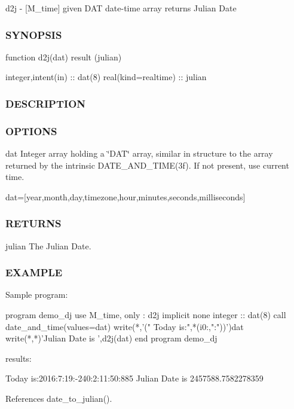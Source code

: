 d2j -\/ \mbox{[}M\+\_\+time\mbox{]} given D\+AT date-\/time array returns Julian Date 

\subsubsection*{S\+Y\+N\+O\+P\+S\+IS}

\begin{DoxyVerb}function d2j(dat) result (julian)

 integer,intent(in)  :: dat(8)
 real(kind=realtime) :: julian
\end{DoxyVerb}


\subsubsection*{D\+E\+S\+C\+R\+I\+P\+T\+I\+ON}

\subsubsection*{O\+P\+T\+I\+O\+NS}

dat Integer array holding a \char`\"{}\+D\+A\+T\char`\"{} array, similar in structure to the array returned by the intrinsic D\+A\+T\+E\+\_\+\+A\+N\+D\+\_\+\+T\+I\+M\+E(3f). If not present, use current time.

dat=\mbox{[}year,month,day,timezone,hour,minutes,seconds,milliseconds\mbox{]} \subsubsection*{R\+E\+T\+U\+R\+NS}

julian The Julian Date.

\subsubsection*{E\+X\+A\+M\+P\+LE}

\begin{DoxyVerb}Sample program:

 program demo_dj
 use M_time, only : d2j
 implicit none
 integer :: dat(8)
    call date_and_time(values=dat)
    write(*,'(" Today is:",*(i0:,":"))')dat
    write(*,*)'Julian Date is ',d2j(dat)
 end program demo_dj

results:

 Today is:2016:7:19:-240:2:11:50:885
 Julian Date is    2457588.7582278359 \end{DoxyVerb}
 

References date\+\_\+to\+\_\+julian().

